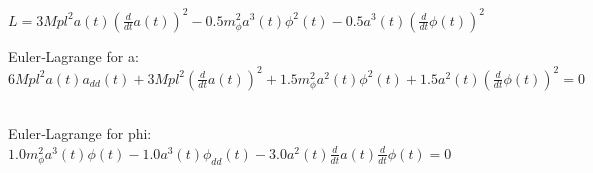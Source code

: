 
$L = 3 Mpl^{2} a{\left(t \right)} \left(\frac{d}{d t} a{\left(t \right)}\right)^{2} - 0.5 m_{\phi}^{2} a^{3}{\left(t \right)} \phi^{2}{\left(t \right)} - 0.5 a^{3}{\left(t \right)} \left(\frac{d}{d t} \phi{\left(t \right)}\right)^{2}$\

Euler‑Lagrange for a: $6 Mpl^{2} a{\left(t \right)} a_{dd}{\left(t \right)} + 3 Mpl^{2} \left(\frac{d}{d t} a{\left(t \right)}\right)^{2} + 1.5 m_{\phi}^{2} a^{2}{\left(t \right)} \phi^{2}{\left(t \right)} + 1.5 a^{2}{\left(t \right)} \left(\frac{d}{d t} \phi{\left(t \right)}\right)^{2} = 0$\

Euler‑Lagrange for phi: $1.0 m_{\phi}^{2} a^{3}{\left(t \right)} \phi{\left(t \right)} - 1.0 a^{3}{\left(t \right)} \phi_{dd}{\left(t \right)} - 3.0 a^{2}{\left(t \right)} \frac{d}{d t} a{\left(t \right)} \frac{d}{d t} \phi{\left(t \right)} = 0$\
